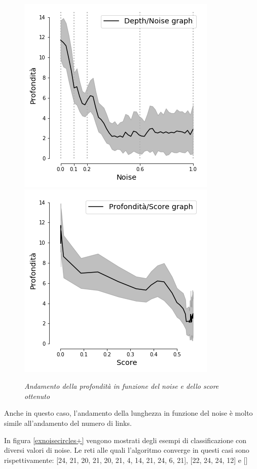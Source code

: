 \documentclass[12pt,a4paper]{report}
\begin{document}
\begin{figure}[H]
 \centering
 \includegraphics[scale = 0.5]{images/depth_noise_circles+}
 \includegraphics[scale = 0.5]{images/depth_Score_circles+}
 \caption{\textit{Andamento della profondità in funzione del noise e dello score ottenuto }}
 \label{depth-score-circle+}
\end{figure}

Anche in questo caso, l'andamento della lunghezza in funzione del noise è molto simile all'andamento del numero di links.

In figura \ref{exnoisecircles+} vengono mostrati degli esempi di classificazione con diversi valori di noise.
Le reti alle quali l'algoritmo converge in questi casi sono rispettivamente: [24, 21, 20, 21, 20, 21, 4, 14, 21, 24, 6, 21], [22, 24, 24, 12] e []
\end{document}
